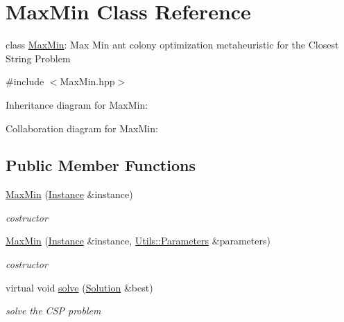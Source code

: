 \hypertarget{classMaxMin}{}\section{Max\+Min Class Reference}
\label{classMaxMin}


class \hyperlink{classMaxMin}{Max\+Min}\+: Max Min ant colony optimization metaheuristic for the Closest String Problem  




{\ttfamily \#include $<$Max\+Min.\+hpp$>$}



Inheritance diagram for Max\+Min\+:


Collaboration diagram for Max\+Min\+:
\subsection*{Public Member Functions}
\begin{DoxyCompactItemize}
\item 
\hyperlink{classMaxMin_a51241e59fae85aaa8fc1cc9a200422ba}{Max\+Min} (\hyperlink{classInstance}{Instance} \&instance)
\begin{DoxyCompactList}\small\item\em costructor \end{DoxyCompactList}\item 
\hyperlink{classMaxMin_a7d83f08e5949824acb82783007dc55a0}{Max\+Min} (\hyperlink{classInstance}{Instance} \&instance, \hyperlink{classUtils_1_1Parameters}{Utils\+::\+Parameters} \&parameters)
\begin{DoxyCompactList}\small\item\em costructor \end{DoxyCompactList}\item 
virtual void \hyperlink{classMaxMin_a27fd649b6f2efc343293d759ee6b5e9d}{solve} (\hyperlink{classSolution}{Solution} \&best)
\begin{DoxyCompactList}\small\item\em solve the C\+SP problem \end{DoxyCompactList}\end{DoxyCompactItemize}
